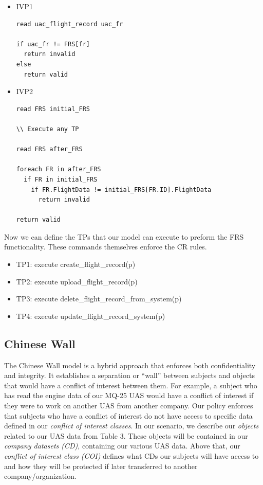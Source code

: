 \documentclass[10pt,journal,compsoc]{IEEEtran}
\begin{document}
\begin{itemize}
  \item IVP1
\begin{lstlisting}
read uac_flight_record uac_fr

if uac_fr != FRS[fr]
  return invalid
else
  return valid
\end{lstlisting}

  \item IVP2
\begin{lstlisting}
read FRS initial_FRS

\\ Execute any TP 

read FRS after_FRS

foreach FR in after_FRS
  if FR in initial_FRS
    if FR.FlightData != initial_FRS[FR.ID].FlightData
      return invalid

return valid
\end{lstlisting}
\end{itemize}

Now we can define the TPs that our model can execute to preform the FRS functionality. These commands themselves enforce the CR rules.

\begin{itemize}
  \item TP1: execute create\_flight\_record(p)
  \item TP2: execute upload\_flight\_record(p)
  \item TP3: execute delete\_flight\_record\_from\_system(p)
  \item TP4: execute update\_flight\_record\_system(p)
\end{itemize}

\subsection{Chinese Wall}

The Chinese Wall model is a hybrid approach that enforces both confidentiality and integrity. It establishes a separation or ``wall'' between subjects and objects that would have a conflict of interest between them. For example, a subject who has read the engine data of our MQ-25 UAS would have a conflict of interest if they were to work on another UAS from another company. Our policy enforces that subjects who have a conflict of interest do not have access to specific data defined in our \textit{conflict of interest classes}. In our scenario, we describe our \textit{objects} related to our UAS data from Table 3. These objects will be contained in our \textit{company datasets (CD)}, containing our various UAS data. Above that, our \textit{conflict of interest class (COI)} defines what CDs our subjects will have access to and how they will be protected if later transferred to another company/organization. 
 
\end{document}
